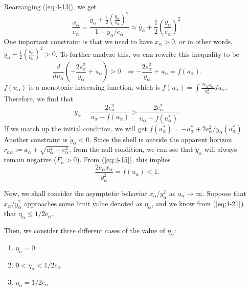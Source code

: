 \documentclass[letterpaper,12pt]{article}
\begin{document}
Rearranging (\ref{eq:4-13}), we get
\begin{equation}\label{eq:4-14}
\frac{x_{\alpha}}{e_{\alpha}} = \frac{\dot{y_{\alpha}}+\frac{1}{2}\left(\frac{y_{
\alpha}}{e_{\alpha}}\right)^{2}}{1-y_{\alpha} \slash e_{\alpha}} \approx \dot{y_{\alpha}}+\frac{1}{2}\left(\frac{y_{
\alpha}}{e_{\alpha}}\right)^{2}.
\end{equation}
One important constraint is that we need to have $x_{\alpha} > 0$, or in other words, $\dot{y_{\alpha}}+\frac{1}{2}\left(\frac{y_{\alpha}}{e_{\alpha}}\right)^{2} > 0$. To further analyze this, we can rewrite this inequality to be
\begin{equation}
\frac{d}{du_{\alpha}}\left(-\frac{2e_{
\alpha}^{2}}{y_{\alpha}} + u_{\alpha}\right) > 0 \textrm{ } \Rightarrow -\frac{2e_{
\alpha}^{2}}{y_{\alpha}} + u_{\alpha} = f(u_{\alpha}).
\end{equation}
$f(u_{\alpha})$ is a monotonic increasing function, which is $f(u_{\alpha}) = \int \frac{2e_{\alpha}x_{\alpha}}{y_{\alpha}^{2}}du_{\alpha}$. 
Therefore, we find that
\begin{equation}\label{eq:4-15}
y_{\alpha} = \frac{2e_{\alpha}^{2}}{u_{\alpha} - f(u_{\alpha})} > \frac{2e_{\alpha}^{2}}{u_{\alpha} - f(u_{\alpha}^{*})}.
\end{equation}
If we match up the initial condition, we will get $ f(u_{\alpha}^{*}) = -u_{\alpha}^{*}+2e_{\alpha}^{2} \slash y_{\alpha}(u_{\alpha}^{*})$.
Another constraint is $\dot{y}_{\alpha} < 0$.  Since the shell is outside the apparent horizon $r_{h\alpha} := a_{\alpha}+\sqrt{a_{\alpha}^{2}-e_{\alpha}^{2}}$, from the null condition, we can see that $\dot{y}_{\alpha}$ will always remain negative ($F_{\alpha} > 0$). From (\ref{eq:4-15}), this implies 
\begin{equation}\label{eq;4-21}
\frac{2e_{\alpha}x_{\alpha}}{y_{\alpha}^{2}} = \dot{f}(u_{\alpha}) < 1.
\end{equation}

Now, we shall consider the asymptotic behavior $x_{\alpha}/y_{\alpha}^{2}$ as $u_{\alpha} \rightarrow \infty$. Suppose that $x_{\alpha}/y_{\alpha}^{2}$ approaches some limit value denoted as $\eta_{\alpha}$, and we know from (\ref{eq;4-21}) that $\eta_{\alpha} \leq 1/2e_{\alpha}$.

Then, we consider three different cases of the value of $\eta_{\alpha}$:

\begin{enumerate}[label={(\arabic*)}, noitemsep]
\item $\eta_{\alpha} = 0$ \label{case1}
\item  $0< \eta_{\alpha} < 1/2e_{\alpha}$\label{case2}
\item $\eta_{\alpha} = 1/2e_{\alpha}$\label{case3}
\end{enumerate}
\end{document}
